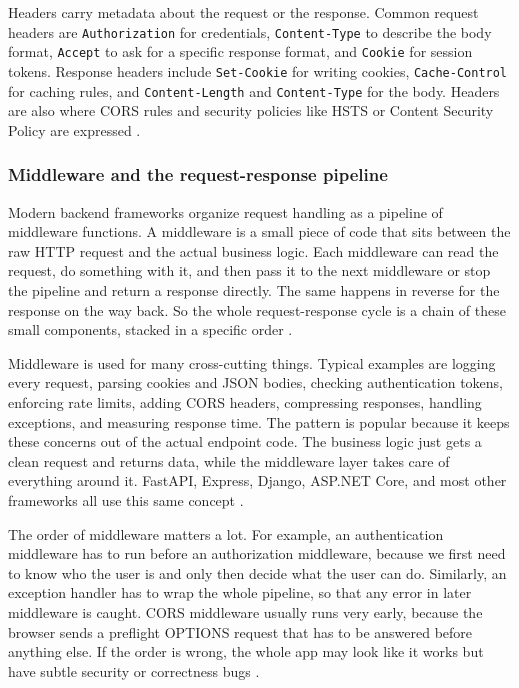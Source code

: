 Headers carry metadata about the request or the response. Common request headers are \texttt{Authorization} for credentials, \texttt{Content-Type} to describe the body format, \texttt{Accept} to ask for a specific response format, and \texttt{Cookie} for session tokens. Response headers include \texttt{Set-Cookie} for writing cookies, \texttt{Cache-Control} for caching rules, and \texttt{Content-Length} and \texttt{Content-Type} for the body. Headers are also where CORS rules and security policies like HSTS or Content Security Policy are expressed \autocite{chinthalapudi2025security}.

\subsubsection{Middleware and the request-response pipeline}
\label{sec:middleware}

Modern backend frameworks organize request handling as a pipeline of middleware functions. A middleware is a small piece of code that sits between the raw HTTP request and the actual business logic. Each middleware can read the request, do something with it, and then pass it to the next middleware or stop the pipeline and return a response directly. The same happens in reverse for the response on the way back. So the whole request-response cycle is a chain of these small components, stacked in a specific order \autocite{kumar2022owasp_middleware}.

Middleware is used for many cross-cutting things. Typical examples are logging every request, parsing cookies and JSON bodies, checking authentication tokens, enforcing rate limits, adding CORS headers, compressing responses, handling exceptions, and measuring response time. The pattern is popular because it keeps these concerns out of the actual endpoint code. The business logic just gets a clean request and returns data, while the middleware layer takes care of everything around it. FastAPI, Express, Django, ASP.NET Core, and most other frameworks all use this same concept \autocite{kumar2022owasp_middleware}.

The order of middleware matters a lot. For example, an authentication middleware has to run before an authorization middleware, because we first need to know who the user is and only then decide what the user can do. Similarly, an exception handler has to wrap the whole pipeline, so that any error in later middleware is caught. CORS middleware usually runs very early, because the browser sends a preflight OPTIONS request that has to be answered before anything else. If the order is wrong, the whole app may look like it works but have subtle security or correctness bugs \autocite{kumar2022owasp_middleware, chinthalapudi2025security}.

